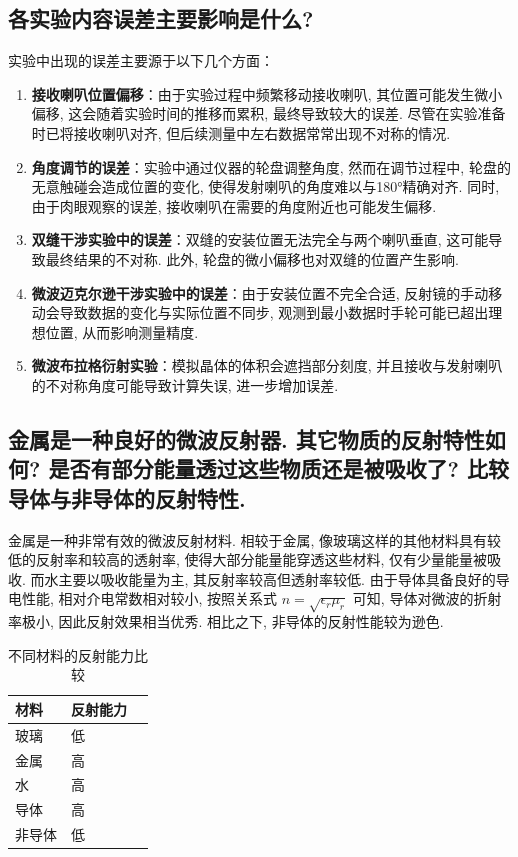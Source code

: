 \documentclass[zihao=5, UTF8]{article}
\theoremstyle{MyLineTheoremStyle} %
\theoremstyle{MyBlockTheoremStyle} %
\theoremstyle{MySubsubsectionStyle} %
\begin{document}
\subsection{各实验内容误差主要影响是什么?}
实验中出现的误差主要源于以下几个方面：
\begin{enumerate}
    \item \textbf{接收喇叭位置偏移}：由于实验过程中频繁移动接收喇叭, 其位置可能发生微小偏移, 这会随着实验时间的推移而累积, 最终导致较大的误差. 尽管在实验准备时已将接收喇叭对齐, 但后续测量中左右数据常常出现不对称的情况. 
    
    \item \textbf{角度调节的误差}：实验中通过仪器的轮盘调整角度, 然而在调节过程中, 轮盘的无意触碰会造成位置的变化, 使得发射喇叭的角度难以与180°精确对齐. 同时, 由于肉眼观察的误差, 接收喇叭在需要的角度附近也可能发生偏移. 
    
    \item \textbf{双缝干涉实验中的误差}：双缝的安装位置无法完全与两个喇叭垂直, 这可能导致最终结果的不对称. 此外, 轮盘的微小偏移也对双缝的位置产生影响. 
    
    \item \textbf{微波迈克尔逊干涉实验中的误差}：由于安装位置不完全合适, 反射镜的手动移动会导致数据的变化与实际位置不同步, 观测到最小数据时手轮可能已超出理想位置, 从而影响测量精度. 
    
    \item \textbf{微波布拉格衍射实验}：模拟晶体的体积会遮挡部分刻度, 并且接收与发射喇叭的不对称角度可能导致计算失误, 进一步增加误差. 
\end{enumerate}
\subsection{金属是一种良好的微波反射器. 其它物质的反射特性如何? 是否有部分能量透过这些物质还是被吸收了? 比较导体与非导体的反射特性.  }
金属是一种非常有效的微波反射材料. 相较于金属, 像玻璃这样的其他材料具有较低的反射率和较高的透射率, 使得大部分能量能穿透这些材料, 仅有少量能量被吸收. 而水主要以吸收能量为主, 其反射率较高但透射率较低. 由于导体具备良好的导电性能, 相对介电常数相对较小, 按照关系式 $ n = \sqrt{\epsilon_r \mu_r} $ 可知, 导体对微波的折射率极小, 因此反射效果相当优秀. 相比之下, 非导体的反射性能较为逊色. 

\begin{table}[H]
    \centering
    \begin{tabular}{@{}lll@{}}
        \toprule
        材料   & 反射能力 \\ \midrule
        玻璃   & 低      \\
        金属   & 高      \\
        水     & 高      \\
        导体   & 高      \\
        非导体 & 低      \\ \bottomrule
    \end{tabular}
    \caption{不同材料的反射能力比较}
    \label{tab:reflectivity}
\end{table}
\end{document}
